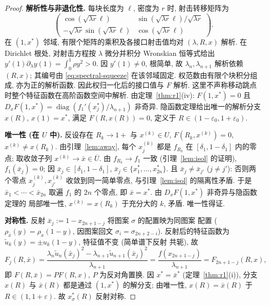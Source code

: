 \documentclass[UTF8]{ctexart}
\begin{document}
\begin{proof}
\textbf{解析性与非退化性.} 每块长度为 $\ell$, 密度为 $r$ 时, 射击转移矩阵为
\begin{equation*}
\begin{pmatrix}
\cos(\sqrt{\lambda r}\ell)&\sin(\sqrt{\lambda r}\ell)/\sqrt{\lambda r}\\
-\sqrt{\lambda r}\sin(\sqrt{\lambda r}\ell)&\cos(\sqrt{\lambda r}\ell)
\end{pmatrix}.
\end{equation*}
在 $(1,x^*)$ 邻域, 有限个矩阵的乘积及各接口射击值均对 $(\lambda,R,x)$ 解析.
在 Dirichlet 根处, 对射击方程按 $\lambda$ 微分并积分 Wronskian 恒等式给出
$y'(1)\partial_\lambda y(1)=\int_0^1\rho y^2>0$.
因 $y'(1)\ne0$, 根简单, 故 $\lambda_n,\lambda_{n+1}$ 解析依赖 $(R,x)$;
其编号由 \eqref{eq:spectral-squeeze} 在该邻域固定. 权范数由有限个块积分组成,
亦为正的解析函数. 因此权归一化后的接口值与 $F$ 解析.
这里不声称移动跳点时整个特征函数在高阶函数空间中解析. 由定理~\ref{thm:r1}(iv): $F(1,x^*)=0$ 且
$D_xF(1,x^*)=\operatorname{diag}(f_1'(x_j^*)/\lambda_{n+1})$ 非奇异.
隐函数定理给出唯一的解析分支 $x(R)$, $x(1)=x^*$, 满足 $F(R,x(R))=0$,
定义于 $R\in(1-\varepsilon_0,1+\varepsilon_0)$.

\textbf{唯一性 (在 $U$ 中).} 反设存在 $R_k\to1+$ 与 $x^{(k)}\in U$,
$F(R_k,x^{(k)})=0$, $x^{(k)}\neq x(R_k)$. 由引理~\ref{lem:away}, 每个
$x_j^{(k)}$ 都是 $f_{R_k}$ 在 $[\delta_1,1-\delta_1]$ 内的零点; 取收敛子列
$x^{(k)}\to\bar x\in\overline U$. 由 $f_{R_k}\to f_1$ 一致 (引理~\ref{lem:isol}
的证明), $f_1(\bar x_j)=0$; 因 $\bar x_j\in[\delta_1,1-\delta_1]$,
$\bar x_j\in\{x_1^*,\dots,x_{2n}^*\}$. 且 $\bar x_j\neq\bar x_{j'}$
($j\neq j'$): 否则两个零点 $x_j^{(k)},x_{j'}^{(k)}$ 收敛到同一简单零点,
与引理~\ref{lem:isol} 的隔离性矛盾. 于是 $\bar x_1<\cdots<\bar x_{2n}$ 取遍
$f_1$ 的 $2n$ 个零点, 即 $\bar x=x^*$. 由 $D_xF(1,x^*)$ 非奇异与隐函数定理的
局部唯一性, $x^{(k)}=x(R_k)$ 于充分大的 $k$, 矛盾. 唯一性得证.

\textbf{对称性.} 反射 $\bar x_j:=1-x_{2n+1-j}$ 将图案 $\sigma$ 的配置映为同图案
配置 ($\rho_{\bar x}(y)=\rho_x(1-y)$, 因图案回文 $\sigma_i=\sigma_{2n+2-i}$).
反射后的特征函数为 $\tilde u_k(y)=\pm u_k(1-y)$, 特征值不变 (简单谱下反射
共轭), 故
\begin{equation*}
	F_j(R,\bar x)=\frac{\lambda_n\tilde u_n(\bar x_j)^2-\lambda_{n+1}\tilde u_{n+1}(\bar x_j)^2}{\lambda_{n+1}}
	=\frac{f(x_{2n+1-j})}{\lambda_{n+1}}=F_{2n+1-j}(R,x),
\end{equation*}
即 $F(R,\bar x)=PF(R,x)$, $P$ 为反对角置换. 因 $x^*=\bar x^*$ (定理~\ref{thm:r1}(i)),
分支 $x(R)$ 与 $\bar x(R)$ 都是通过 $(1,x^*)$ 的解分支; 由唯一性,
$x(R)=\bar x(R)$ 于 $R\in(1,1+\varepsilon)$. 故 $x_\sigma^*(R)$ 反射对称.


\end{proof}
\end{document}
